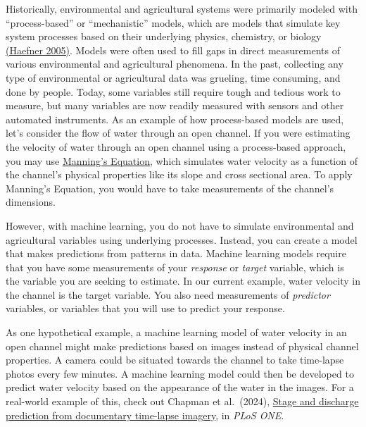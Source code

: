 \documentclass[
]{book}
\begin{document}
Historically, environmental and agricultural systems were primarily modeled with ``process-based'' or ``mechanistic'' models, which are models that simulate key system processes based on their underlying physics, chemistry, or biology \href{https://link.springer.com/book/10.1007/b106568}{(Haefner 2005)}. Models were often used to fill gaps in direct measurements of various environmental and agricultural phenomena. In the past, collecting any type of environmental or agricultural data was grueling, time consuming, and done by people. Today, some variables still require tough and tedious work to measure, but many variables are now readily measured with sensors and other automated instruments.
As an example of how process-based models are used, let's consider the flow of water through an open channel. If you were estimating the velocity of water through an open channel using a process-based approach, you may use \href{https://www.weather.gov/aprfc/normaldepthcalc}{Manning's Equation}, which simulates water velocity as a function of the channel's physical properties like its slope and cross sectional area. To apply Manning's Equation, you would have to take measurements of the channel's dimensions.

However, with machine learning, you do not have to simulate environmental and agricultural variables using underlying processes. Instead, you can create a model that makes predictions from patterns in data. Machine learning models require that you have some measurements of your \emph{response} or \emph{target} variable, which is the variable you are seeking to estimate. In our current example, water velocity in the channel is the target variable. You also need measurements of \emph{predictor} variables, or variables that you will use to predict your response.

As one hypothetical example, a machine learning model of water velocity in an open channel might make predictions based on images instead of physical channel properties. A camera could be situated towards the channel to take time-lapse photos every few minutes. A machine learning model could then be developed to predict water velocity based on the appearance of the water in the images. For a real-world example of this, check out Chapman et al.~(2024), \href{https://journals.plos.org/water/article?id=10.1371/journal.pwat.0000106}{Stage and discharge prediction from documentary time-lapse imagery}, in \emph{PLoS ONE}.
\end{document}
